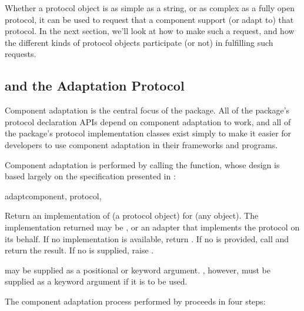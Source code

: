 Whether a protocol object is as simple as a string, or as complex as a
fully open protocol, it can be used to request that a component support
(or adapt to) that protocol.  In the next section, we'll look at how to make
such a request, and how the different kinds of protocol objects participate
(or not) in fulfilling such requests.


\subsection{ and the Adaptation Protocol
\label{adapt-protocol}}

Component adaptation is the central focus of the  package.
All of the package's protocol declaration APIs depend on component adaptation
to work, and all of the package's protocol implementation classes exist
simply to make it easier for developers to use component adaptation in their
frameworks and programs.

Component adaptation is performed by calling the  function,
whose design is based largely on the specification presented in :

\begin{funcdesc}{adapt}{component, protocol,
}

Return an implementation of  (a protocol object) for
 (any object).  The implementation returned may be
, or an adapter that implements the protocol on its
behalf.  If no implementation is available, return .  If no
 is provided, call  and return the result.  If no  is supplied,
raise .

 may be supplied as a positional or keyword argument.
, however, must be supplied as a keyword argument if it is
to be used.

\end{funcdesc}

The component adaptation process performed by  proceeds
in four steps:

